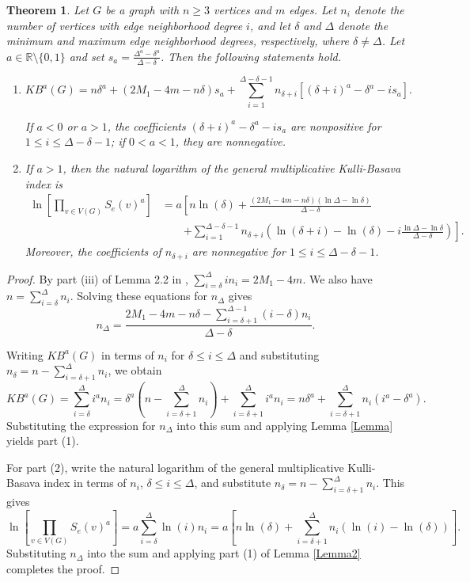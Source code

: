 \documentclass[10pt,a4paper]{amsart}
\newtheorem{theorem}{Theorem}[section]
\numberwithin{equation}{section}
\begin{document}
\begin{theorem}\label{Theorem1}
Let $G$ be a graph with $n\geq 3$ vertices and $m$ edges. Let $n_i$ denote the number of vertices with edge neighborhood degree $i$, and let $\delta$ and $\Delta$ denote the minimum and maximum edge neighborhood degrees, respectively, where $\delta\neq\Delta$. Let $a\in\mathbb{R}\setminus\{0,1\}$ and set $s_a=\frac{\Delta^a-\delta^a}{\Delta-\delta}$. Then the following statements hold.
    \begin{enumerate}
\item 
        \[KB^a(G) = n\delta^a +  (2M_1 - 4m - n\delta)s_a +\sum_{i =1}^{\Delta - \delta - 1}n_{\delta + i} \left[(\delta + i)^a - \delta^a  - is_a\right].\]

If $a<0$ or $a>1$, the coefficients $(\delta+i)^a-\delta^a-is_a$ are nonpositive for $1\leq i\leq\Delta-\delta-1$; if $0<a<1$, they are nonnegative.

\item If $a>1$, then the natural logarithm of the general multiplicative Kulli-Basava index is
\[
\begin{aligned}
\ln\left[\prod_{v\in V(G)}S_e(v)^a\right]
&=a\left[n\ln(\delta)+\frac{(2M_1-4m-n\delta)(\ln\Delta-\ln\delta)}{\Delta-\delta}\right.\\
&\qquad\left.+\sum_{i=1}^{\Delta-\delta-1}n_{\delta+i}\left(\ln(\delta+i)-\ln(\delta)-i\frac{\ln\Delta-\ln\delta}{\Delta-\delta}\right)\right].
\end{aligned}
\]
Moreover, the coefficients of $n_{\delta+i}$ are nonnegative for $1\leq i\leq\Delta-\delta-1$.
\end{enumerate} 
\end{theorem}
\begin{proof}

By part (iii) of Lemma 2.2 in \cite{basavanagoud2019kulli}, $\sum_{i=\delta}^\Delta i n_i=2M_1-4m$. We also have $n=\sum_{i=\delta}^\Delta n_i$. Solving these equations for $n_\Delta$ gives
\[
n_\Delta=\frac{2M_1 - 4m - n\delta - \sum_{i=\delta + 1}^{\Delta  - 1}(i - \delta)n_i}{\Delta - \delta}.
\]

Writing $KB^a(G)$ in terms of $n_i$ for $\delta\leq i\leq\Delta$ and substituting $n_\delta=n-\sum_{i=\delta+1}^\Delta n_i$, we obtain
\[
KB^a(G) = \sum_{i=\delta}^\Delta  i^a n_i = \delta^a\left( n - \sum_{i= \delta + 1}^\Delta n_i\right) + \sum_{i=\delta + 1}^\Delta  i^a n_i = n\delta^a + \sum_{i = \delta + 1}^\Delta  n_i(i^a - \delta^a).
\]
Substituting the expression for $n_\Delta$ into this sum and applying Lemma \ref{Lemma} yields part (1).

For part (2), write the natural logarithm of the general multiplicative Kulli-Basava index in terms of $n_i$, $\delta\leq i\leq\Delta$, and substitute $n_\delta=n-\sum_{i=\delta+1}^\Delta n_i$. This gives
\[
\ln\left[\prod_{v\in V(G)}S_e(v)^a\right]=a\sum_{i=\delta}^\Delta \ln(i)n_i=a\left[n\ln(\delta)+\sum_{i=\delta+1}^\Delta n_i(\ln(i)-\ln(\delta))\right].
\]
Substituting $n_\Delta$ into the sum and applying part (1) of Lemma \ref{Lemma2} completes the proof.

\end{proof}
\end{document}
